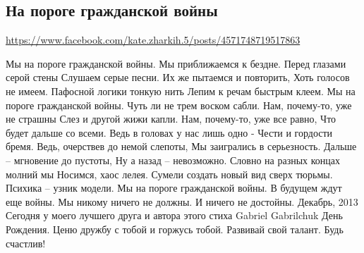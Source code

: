  
 
 
 
 

\subsection{На пороге гражданской войны}
\label{sec:27_06_2020.fb.1.civil_war_poezia_2013}
\url{https://www.facebook.com/kate.zharkih.5/posts/4571748719517863}

Мы на пороге гражданской войны.
Мы приближаемся к бездне.
Перед глазами серой стены 
Слушаем серые песни.
Их же пытаемся и повторить,
Хоть голосов не имеем.
Пафосной логики тонкую нить
Лепим к речам быстрым клеем.
Мы на пороге гражданской войны.
Чуть ли не трем воском сабли.
Нам, почему-то, уже не страшны
Слез и другой жижи капли.
Нам, почему-то, уже все равно,
Что будет дальше со всеми.
Ведь в головах у нас лишь одно - 
Чести и гордости бремя.
Ведь, очерствев до немой слепоты,
Мы заигрались в серьезность.
Дальше – мгновение до пустоты,
Ну а назад – невозможно.
Словно на разных концах молний мы
Носимся, хаос лелея.
Сумели создать новый вид сверх тюрьмы.
Психика – узник модели.
Мы на пороге гражданской войны.
В будущем ждут еще войны.
Мы никому ничего не должны.
И ничего не достойны.
Декабрь, 2013
Сегодня у моего лучшего друга и автора этого стиха Gabriel Gabrilchuk
 День Рождения. Ценю дружбу с тобой и горжусь тобой. Развивай свой талант. Будь счастлив!
